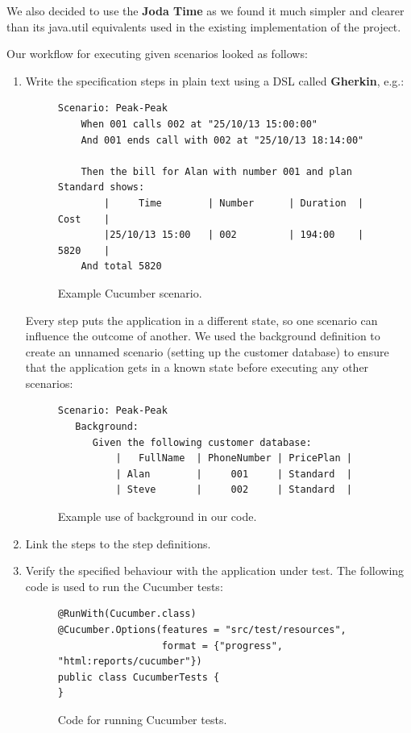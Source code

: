 \documentclass[a4paper]{article}
\begin{document}
We also decided to use the {\bf Joda Time} as we found it much simpler and clearer than its java.util equivalents used in the existing implementation of the project.

Our workflow for executing given scenarios looked as follows:
\begin{enumerate}
\item Write the specification steps in plain text using a DSL called {\bf Gherkin}, e.g.:

\begin{figure}[h]
\begin{verbatim}
Scenario: Peak-Peak
    When 001 calls 002 at "25/10/13 15:00:00"
    And 001 ends call with 002 at "25/10/13 18:14:00"

    Then the bill for Alan with number 001 and plan Standard shows:
        |     Time        | Number      | Duration  | Cost    |
        |25/10/13 15:00   | 002         | 194:00    | 5820    |
    And total 5820

\end{verbatim}
\caption{Example Cucumber scenario.}
\end{figure}

Every step puts the application in a different state, so one scenario can influence the outcome of another. We used the background definition to create an unnamed scenario (setting up the customer database) to ensure that the application gets in a known state before executing any other scenarios:

\begin{figure}[h]
\begin{verbatim}
Scenario: Peak-Peak
   Background:
      Given the following customer database:
          |   FullName  | PhoneNumber | PricePlan |
          | Alan        |     001     | Standard  |
          | Steve       |     002     | Standard  |

\end{verbatim}
\caption{Example use of background in our code.}
\end{figure}

\item Link the steps to the step definitions.
\item Verify the specified behaviour with the application under test.
The following code is used to run the Cucumber tests:

\begin{figure}[h]
\begin{verbatim}
@RunWith(Cucumber.class)
@Cucumber.Options(features = "src/test/resources",
                  format = {"progress", "html:reports/cucumber"})
public class CucumberTests {
}

\end{verbatim}
\caption{Code for running Cucumber tests.}
\end{figure}

\end{enumerate}
\end{document}
